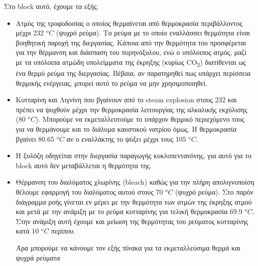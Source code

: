\documentclass[11pt]{article}
\begin{document}
Στο block αυτό, έχουμε τα εξής.
\begin{itemize}
\item Aτμός της τροφοδοσίας ο οποίος θερμαίνεται από θερμοκρασία περιβάλλοντος μέχρι 232 \(^oC\) (ψυχρό ρεύμα). Το ρεύμα με το οποίο εναλλάσσει θερμότητα είναι βοηθητική παροχή της διεργασίας. Κάποια από την θερμότητα του προσφέρεται για την θέρμανση και διάσπαση του πυρηνόξυλου, ενώ ο υπόλοιπος ατμός, μαζί με τα υπόλοιπα ατμώδη υπολείμματα της έκρηξης (κυρίως CO\textsubscript{2}) διατίθενται ως ένα θερμό ρεύμα της διεργασίας. Βέβαια, αν παρατηρηθεί πως υπάρχει περίσσεια θερμικής ενέργειας, μπορεί αυτό το ρεύμα να μην χρησιμοποιηθεί.
\item Κυτταρίνη και Λιγνίνη που βγαίνουν από το steam explosion στους 232 και πρέπει να ψυχθούν μέχρι την θερμοκρασία λειτουργίας της αλκαλικής εκχύλισης (80 \(^oC\)). Μπορούμε να εκμεταλλευτούμε το υπάρχον θερμικό περιεχόμενο τους για να θερμάνουμε και το διάλυμα καυστικού νατρίου όμως. Η θερμοκρασία βγαίνει 80.65 \(^oC\) αν ο εναλλάκτης το ψύξει μέχρι τους 105 \(^oC\).
\item Η ξυλόζη οδηγείται στην διεργασία παραγωγής κυκλοπεντανόνης, για αυτό για το block αυτό δεν μεταβάλλεται η θερμότητα της.
\item Θέρμανση του διαλύματος χλωρίνης (bleach) καθώς για την πλήρη απολιγνοποίση θέλουμε εφαρμογή του διαλύματος αυτού στους 70 \(^oC\) (ψυχρό ρεύμα). Στο παρόν διάγραμμα ροής γίνεται εν μέρει με την θερμότητα των ατμών της έκρηξης ατμού και μετά με την ανάμιξη με το ρεύμα κυτταρίνης για τελική θερμοκρασία 69.9 \(^oC\). Στην ανάμιξη αυτή έχουμε και μείωση της θερμότητας του ρεύματος κυτταρίνης κατά 10 \(^oC\) περίπου.

Άρα μπορούμε να κάνουμε τον εξής πίνακα για τα εκμεταλλεύσιμα θερμά και ψυχρά ρεύματα
\end{itemize}
\end{document}
